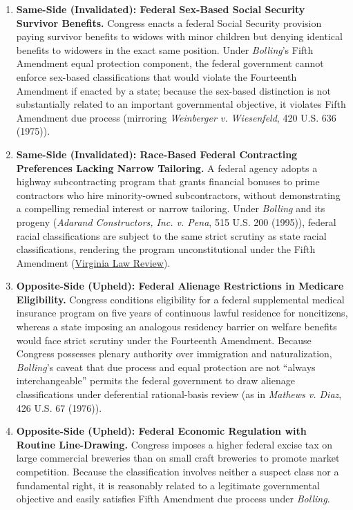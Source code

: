 \documentclass[12pt]{article}
\begin{document}
\begin{enumerate}
  \item \textbf{Same-Side (Invalidated): Federal Sex-Based Social Security Survivor Benefits.} Congress enacts a federal Social Security provision paying survivor benefits to widows with minor children but denying identical benefits to widowers in the exact same position. Under \textit{Bolling}'s Fifth Amendment equal protection component, the federal government cannot enforce sex-based classifications that would violate the Fourteenth Amendment if enacted by a state; because the sex-based distinction is not substantially related to an important governmental objective, it violates Fifth Amendment due process (mirroring \textit{Weinberger v. Wiesenfeld}, 420 U.S. 636 (1975)).

  \item \textbf{Same-Side (Invalidated): Race-Based Federal Contracting Preferences Lacking Narrow Tailoring.} A federal agency adopts a highway subcontracting program that grants financial bonuses to prime contractors who hire minority-owned subcontractors, without demonstrating a compelling remedial interest or narrow tailoring. Under \textit{Bolling} and its progeny (\textit{Adarand Constructors, Inc. v. Pena}, 515 U.S. 200 (1995)), federal racial classifications are subject to the same strict scrutiny as state racial classifications, rendering the program unconstitutional under the Fifth Amendment (\href{https://virginialawreview.org/wp-content/uploads/2020/12/1879.pdf}{Virginia Law Review}).

  \item \textbf{Opposite-Side (Upheld): Federal Alienage Restrictions in Medicare Eligibility.} Congress conditions eligibility for a federal supplemental medical insurance program on five years of continuous lawful residence for noncitizens, whereas a state imposing an analogous residency barrier on welfare benefits would face strict scrutiny under the Fourteenth Amendment. Because Congress possesses plenary authority over immigration and naturalization, \textit{Bolling}'s caveat that due process and equal protection are not ``always interchangeable'' permits the federal government to draw alienage classifications under deferential rational-basis review (as in \textit{Mathews v. Diaz}, 426 U.S. 67 (1976)).

  \item \textbf{Opposite-Side (Upheld): Federal Economic Regulation with Routine Line-Drawing.} Congress imposes a higher federal excise tax on large commercial breweries than on small craft breweries to promote market competition. Because the classification involves neither a suspect class nor a fundamental right, it is reasonably related to a legitimate governmental objective and easily satisfies Fifth Amendment due process under \textit{Bolling}.


\end{enumerate}
\end{document}
